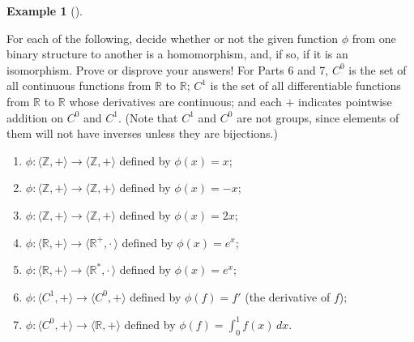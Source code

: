 \documentclass[10pt,]{book}
\theoremstyle{plain}
\theoremstyle{definition}
\theoremstyle{definition}
\theoremstyle{definition}
\newtheorem{example}[theorem]{Example}
\theoremstyle{definition}
\numberwithin{equation}{section}
\def\Z{\mathbb{Z}}
\def\R{\mathbb{R}}
\begin{document}
\begin{example}[]\label{homos}

        For each of the following, decide whether or not the given function
        \(\phi\) from one binary structure to another is a homomorphism, and,
        if so, if it is an isomorphism. Prove or disprove your answers! For
        Parts 6 and 7, \(C^0\) is the set of all continuous functions from
        \(\R\) to \(\R\); \(C^1\) is the set of all differentiable functions
        from \(\R\) to \(\R\) whose derivatives are continuous; and each
        \(+\) indicates pointwise addition on \(C^0\) and \(C^1\). (Note that
        \(C^1\) and \(C^0\) are not groups, since elements of them will not have
        inverses unless they are bijections.)
        \leavevmode%
\begin{enumerate}
\item\hypertarget{li-132}{}
              \(\phi:\langle \Z,+\rangle \to \langle \Z,+\rangle\) defined by \(\phi(x)=x\);
\item\hypertarget{li-133}{}
              \(\phi:\langle \Z,+\rangle \to \langle \Z,+\rangle\) defined by \(\phi(x)=-x\);
\item\hypertarget{li-134}{}
              \(\phi:\langle \Z,+\rangle \to \langle \Z,+\rangle\) defined by \(\phi(x)=2x\);
\item\hypertarget{li-135}{}
              \(\phi:\langle \R,+\rangle \to \langle \R^+,\cdot\,\rangle\) defined by \(\phi(x)=e^x\);
\item\hypertarget{li-136}{}
              \(\phi:\langle \R,+\rangle \to \langle \R^*,\cdot\,\rangle\) defined by \(\phi(x)=e^x\);
\item\hypertarget{li-137}{}
              \(\phi:\langle C^1,+\rangle \to \langle C^0,+\rangle\) defined by \(\phi(f)=f'\) (the derivative of
              \(f\));
\item\hypertarget{li-138}{}
              \(\phi:\langle C^0,+\rangle \to \langle \R,+\rangle\) defined by \(\phi(f)=\displaystyle{\int_0^1 f(x)\, dx}\).
\end{enumerate}

\label{notation-46}
\label{notation-47}
\end{example}
\end{document}
